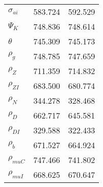 \begin{center}
\begin{longtable}{lcc}
$ {\sigma_{ai}}        $	 & 	     583.724	 & 	     592.529 \\ 
$ {\Psi_{K}}           $	 & 	     748.836	 & 	     748.614 \\ 
$ {\theta}             $	 & 	     745.309	 & 	     745.173 \\ 
$ {\rho_g}             $	 & 	     748.785	 & 	     747.659 \\ 
$ {\rho_Z}             $	 & 	     711.359	 & 	     714.832 \\ 
$ {\rho_{ZI}}          $	 & 	     683.500	 & 	     680.774 \\ 
$ {\rho_N}             $	 & 	     344.278	 & 	     328.468 \\ 
$ {\rho_D}             $	 & 	     662.717	 & 	     645.581 \\ 
$ {\rho_{DI}}          $	 & 	     329.588	 & 	     322.433 \\ 
$ {\rho_b}             $	 & 	     671.527	 & 	     664.924 \\ 
$ {\rho_{muC}}         $	 & 	     747.466	 & 	     741.802 \\ 
$ {\rho_{muI}}         $	 & 	     668.625	 & 	     670.647 \\ 
\end{longtable}
 \end{center}
